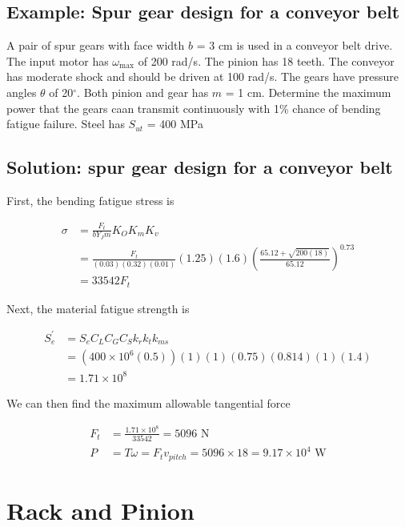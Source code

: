 \documentclass[a4paper,openany]{tufte-book}
\begin{document}
\subsection{Example: Spur gear design for a conveyor belt}
\label{sec:org5680455}

A pair of spur gears with face width \(b\) = 3 cm is used in a conveyor belt drive. The input motor has \(\omega_{\max}\) of 200 rad/s. The pinion has 18 teeth. The conveyor has moderate shock and should be driven at 100 rad/s. The gears have pressure angles \(\theta\) of 20\(^{\circ}\). Both pinion and gear has \(m\) = 1 cm. Determine the maximum power that the gears caan transmit continuously with 1\% chance of bending fatigue failure. Steel has \(S_{ut}\) = 400 MPa

\subsection{Solution: spur gear design for a conveyor belt}
\label{sec:org6b9302c}

First, the bending fatigue stress is

\begin{align*}
  \sigma &= \frac{F_{t}}{bY_{J}m} K_{O}K_{m}K_{v} \\
         &= \frac{F_{t}}{(0.03)(0.32)(0.01)} (1.25)(1.6) \left( \frac{65.12 + \sqrt{200(18)}}{65.12} \right)^{0.73} \\
         &= 33542 F_{t}
\end{align*}

Next, the material fatigue strength is

\begin{align*}
  S_{e}^{\prime} &= S_{e}C_{L}C_{G}C_{S}k_{r}k_{t}k_{ms} \\
                 &= (400 \times 10^{6}(0.5))(1)(1)(0.75)(0.814)(1)(1.4) \\
                 &= 1.71 \times 10^{8}
  \end{align*}

We can then find the maximum allowable tangential force

\begin{align*}
  F_{t} &= \frac{1.71 \times 10^{8}}{33542} = 5096 \text{ N} \\
  P &= T \omega = F_{t} v_{pitch} = 5096 \times 18 = 9.17 \times 10^{4} \text{ W}
\end{align*}

\section{Rack and Pinion}
\label{sec:org7244489}
\end{document}
